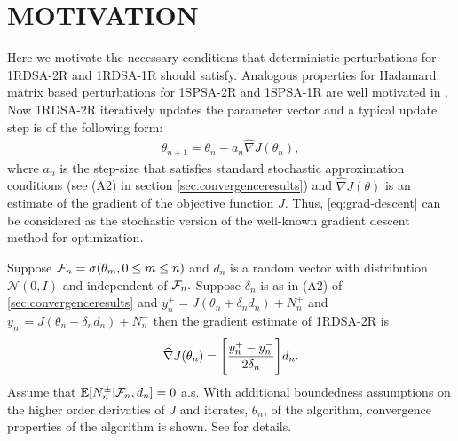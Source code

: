 \documentclass[letterpaper, 10 pt, conference]{ieeeconf}  %
\begin{document}
\section{MOTIVATION}
Here we motivate the necessary conditions that deterministic perturbations for 1RDSA-2R and 1RDSA-1R 
should satisfy. Analogous properties for Hadamard matrix based perturbations for 1SPSA-2R and 1SPSA-1R are 
well motivated in \cite{bhatnagar-book}.
Now 1RDSA-2R iteratively updates the parameter vector and a typical update step
is of the following form:
\begin{align}
\label{eq:grad-descent}
\theta_{n+1} = \theta_n - a_n \widehat\nabla J(\theta_n), 
\end{align}
where $a_n$ is the step-size that satisfies standard stochastic approximation 
conditions (see (A2) in section \ref{sec:convergenceresults}) and $\widehat\nabla 
J(\theta)$ is an estimate of the gradient of the objective function $J$.
Thus, \eqref{eq:grad-descent} can be considered as 
the stochastic version of the well-known gradient descent method for optimization.

Suppose $\mathcal{F}_n = \sigma(\theta_m, 0\le m\le n)$ and $d_n$ is a random vector with distribution $\mathcal{N}(0,I)$ and
independent of $\mathcal{F}_n.$ Suppose $\delta_n $ is as in (A2) of \ref{sec:convergenceresults} 
and $y_n^+=J(\theta_n+\delta_nd_n)+N_n^+$ and 
$y_n^-=J(\theta_n-\delta_nd_n)+N_n^-$ then the gradient estimate of 1RDSA-2R is
$$\widehat\nabla J(\theta_n)= \Bigg{[}\frac{y_n^+-y_n^-}{2\delta_n}\Bigg{]}d_n.$$
Assume that $\mathbb{E}[N_{n}^{\pm}| \mathcal{F}_n,d_n] = 0$ a.s. With additional boundedness assumptions on the 
higher order derivaties of $J$ and iterates, $\theta_n$, of the algorithm, convergence properties of 
the algorithm is shown. See \cite{kushcla} for details.
\end{document}
